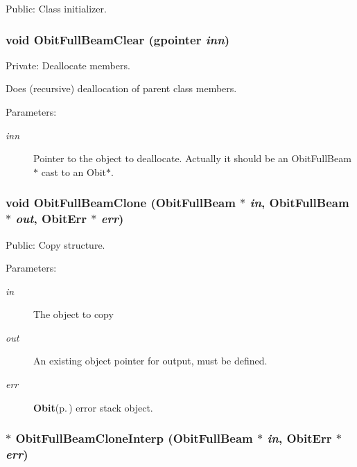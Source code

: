 Public: Class initializer. 

\subsubsection{\setlength{\rightskip}{0pt plus 5cm}void Obit\-Full\-Beam\-Clear (gpointer {\em inn})}\label{ObitFullBeam_8c_a4}


Private: Deallocate members. 

Does (recursive) deallocation of parent class members. \begin{Desc}
\item[Parameters:]
\begin{description}
\item[{\em inn}]Pointer to the object to deallocate. Actually it should be an Obit\-Full\-Beam$\ast$ cast to an Obit$\ast$. \end{description}
\end{Desc}
\subsubsection{\setlength{\rightskip}{0pt plus 5cm}void Obit\-Full\-Beam\-Clone ({\bf Obit\-Full\-Beam} $\ast$ {\em in}, {\bf Obit\-Full\-Beam} $\ast$ {\em out}, {\bf Obit\-Err} $\ast$ {\em err})}\label{ObitFullBeam_8c_a10}


Public: Copy structure. 

\begin{Desc}
\item[Parameters:]
\begin{description}
\item[{\em in}]The object to copy \item[{\em out}]An existing object pointer for output, must be defined. \item[{\em err}]{\bf Obit}{\rm (p.\,\pageref{structObit})} error stack object. \end{description}
\end{Desc}
\subsubsection{$\ast$ Obit\-Full\-Beam\-Clone\-Interp ({\bf Obit\-Full\-Beam} $\ast$ {\em in}, {\bf Obit\-Err} $\ast$ {\em err})}\label{ObitFullBeam_8c_a15}


